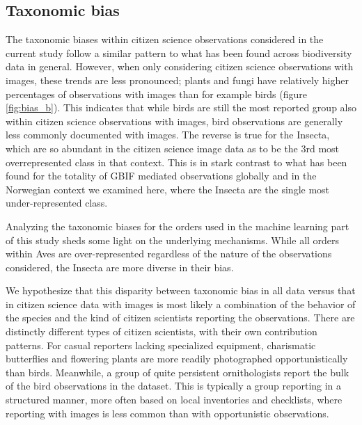\documentclass{article}
\begin{document}
\subsection*{Taxonomic bias}
The taxonomic biases within citizen science observations considered in the current study follow a similar pattern to what has been found across biodiversity data in general\autocite{Troudet2017}. However, when only considering citizen science observations with images, these trends are less pronounced; plants and fungi have relatively higher percentages of observations with images than for example birds (figure \ref{fig:bias_b}). This indicates that while birds are still the most reported group also within citizen science observations with images, bird observations are generally less commonly documented with images. The reverse is true for the Insecta, which are so abundant in the citizen science image data as to be the 3rd most overrepresented class in that context. This is in stark contrast to what has been found for the totality of GBIF mediated observations globally\autocite{Troudet2017} and in the Norwegian context we examined here, where the Insecta are the single most under-represented class.

Analyzing the taxonomic biases for the orders used in the machine learning part of this study sheds some light on the underlying mechanisms. While all orders within Aves are over-represented regardless of the nature of the observations considered, the Insecta are more diverse in their bias.

We hypothesize that this disparity between taxonomic bias in all data versus that in citizen science data with images is most likely a combination of the behavior of the species and the kind of citizen scientists reporting the observations. There are distinctly different types of citizen scientists, with their own contribution patterns\autocite{Aristeidou2017}. For casual reporters lacking specialized equipment, charismatic butterflies and flowering plants are more readily photographed opportunistically than birds. Meanwhile, a group of quite persistent ornithologists report the bulk of the bird observations in the dataset. This is typically a group reporting in a structured manner, more often based on local inventories and checklists, where reporting with images is less common than with opportunistic observations.
\end{document}
